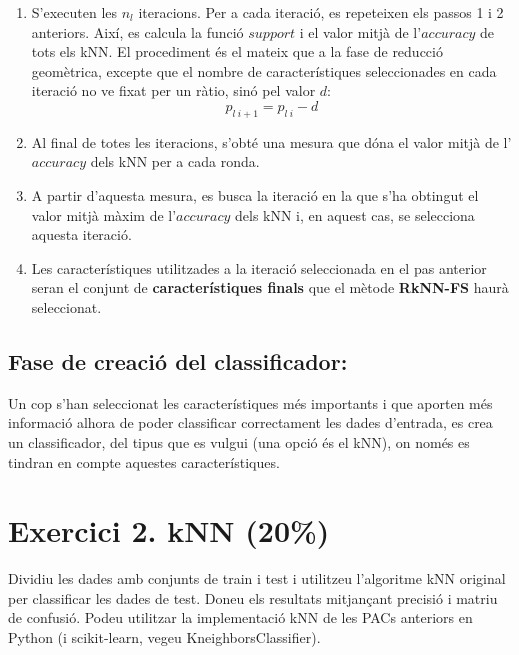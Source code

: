 \documentclass{article} %
\begin{document}
{\begin{enumerate}
{\begin{enumerate}
{\begin{enumerate}
{\begin{enumerate}
{								}
								\item {
									S'executen les $n_l$ iteracions. Per a cada iteració, es repeteixen els passos 1 i 2 anteriors. Així, es calcula la funció $support$ i el valor mitjà de l'$accuracy$ de tots els kNN. El procediment és el mateix que a la fase de reducció geomètrica, excepte que el nombre de característiques seleccionades en cada iteració no ve fixat per un ràtio, sinó pel valor $d$:
									\[p_{l\ i+1} = p_{l\ i} - d \]
								}
								\item Al final de totes les iteracions, s'obté una mesura que dóna el valor mitjà de l'$accuracy$ dels kNN per a cada ronda.
								\item A partir d'aquesta mesura, es busca la iteració en la que s'ha obtingut el valor mitjà màxim de l'$accuracy$ dels kNN i, en aquest cas, se selecciona aquesta iteració.
								\item Les característiques utilitzades a la iteració seleccionada en el pas anterior seran el conjunt de \textbf{característiques finals} que el mètode \textbf{RkNN-FS} haurà seleccionat.
							\end{enumerate}
						}
					\end{enumerate}
				}
			\end{enumerate}
		}
	\end{enumerate}

	\subsection*{Fase de creació del classificador:}

	Un cop s'han seleccionat les característiques més importants i que aporten més informació alhora de poder classificar correctament les dades d'entrada, es crea un classificador, del tipus que es vulgui (una opció és el kNN), on només es tindran en compte aquestes característiques.
}

\section{Exercici 2. kNN (20\%)}
Dividiu les dades amb conjunts de train i test i utilitzeu l’algoritme kNN original per classificar les dades de test. Doneu els resultats mitjançant precisió i matriu de confusió. Podeu utilitzar la implementació kNN de les PACs anteriors en Python (i scikit-learn, vegeu KneighborsClassifier). \\
\end{document}
